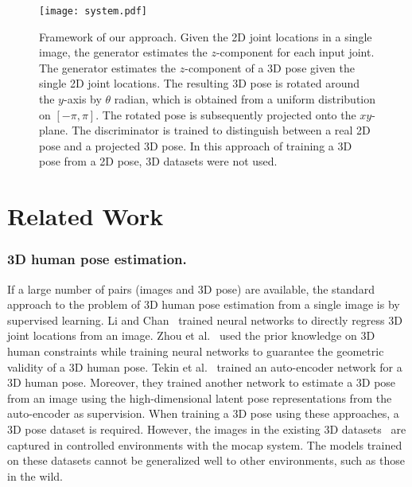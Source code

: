 \documentclass[runningheads]{llncs}
\begin{document}
\begin{figure}[tb]
  \begin{center}
    \texttt{[image: system.pdf]}
    \caption{
Framework of our approach.
Given the 2D joint locations in a single image, the generator estimates the $z$-component for each input joint.
The generator estimates the $z$-component of a 3D pose given the single 2D joint locations. 
The resulting 3D pose is rotated around the $y$-axis by $\theta$ radian, which is obtained from a uniform distribution on $[-\pi, \pi]$.
The rotated pose is subsequently projected onto the $xy$-plane.
The discriminator is trained to distinguish between a real 2D pose and a projected 3D pose.
In this approach of training a 3D pose from a 2D pose, 3D datasets were not used.
}
    \label{system}
  \end{center}
\end{figure}

\section{Related Work}


\subsubsection{3D human pose estimation.}
If a large number of pairs (images and 3D pose) are available, the standard approach to the problem of 3D human pose estimation from a single image is by supervised learning.
Li and Chan~\cite{li20143dpose} trained neural networks to directly regress 3D joint locations from an image.
Zhou et al.~\cite{zhou2016deepkinematic} used the prior knowledge on 3D human constraints while training neural networks to guarantee the geometric validity of a 3D human pose.
Tekin et al.~\cite{tekin2016structured} trained an auto-encoder network for a 3D human pose.
Moreover, they trained another network to estimate a 3D pose from an image using the high-dimensional latent pose representations from the auto-encoder as supervision.
When training a 3D pose using these approaches, a 3D pose dataset is required.
However, the images in the existing 3D datasets~\cite{sigal2010humaneva,ionescu2014human3.6m,mpi-inf} are captured in controlled environments with the mocap system.
The models trained on these datasets cannot be generalized well to other environments, such as those in the wild.
\end{document}
